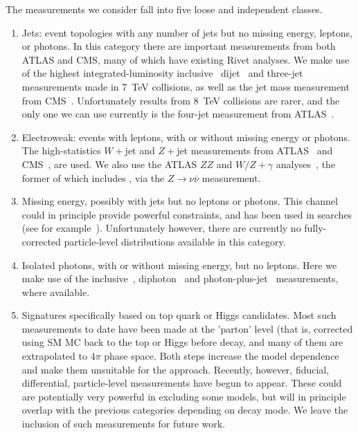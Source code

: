 \documentclass[floatfix]{article}
\begin{document}
The measurements we consider fall into five loose and independent classes.
\begin{enumerate}
\item
Jets: event topologies with any number of jets but no missing energy, leptons, or photons. In this category there
are important measurements from both ATLAS and CMS, many of which have existing Rivet analyses. We make use of 
the highest integrated-luminosity inclusive~\cite{Aad:2014vwa,Chatrchyan:2014gia} dijet~\cite{Aad:2013tea,Aad:2014pua} 
and three-jet~\cite{Aad:2014rma} %
measurements made in 7~TeV collisions, as well as the jet mass 
measurement from CMS~\cite{Chatrchyan:2013vbb}.
Unfortunately results from 8~TeV collisions are rarer, and the only one we can use currently is the four-jet 
measurement from ATLAS~\cite{Aad:2015nda}.
\item
Electroweak: events with leptons, with or without missing energy or photons. The high-statistics $W+$jet and $Z+$jet measurements from ATLAS~\cite{Aad:2014qxa,Aad:2013ysa} 
and CMS~\cite{Khachatryan:2014uva}, are used.
We also use the ATLAS $ZZ$ and $W/Z+\gamma$ analyses~\cite{Aad:2012awa,Aad:2013izg}, the former of which includes \MET, 
via the $Z \rightarrow \nu\bar{\nu}$ measurement.
\item
Missing energy, possibly with jets but no leptons or photons. This channel could in principle provide powerful constraints, and has been used in searches (see for example~\cite{Aad:2012fqa}). Unfortunately however, there are currently no fully-corrected particle-level distributions available in this category. 
\item
Isolated photons, with or without missing energy, but no leptons. Here we make use of the inclusive~\cite{Aad:2013zba}, diphoton~\cite{Aad:2012tba} and 
photon-plus-jet~\cite{ATLAS:2012ar} measurements, where available.
\item
Signatures specifically based on top quark or Higgs candidates. Most such measurements to date have been made at the 'parton' level (that is,
corrected using SM MC back to the top or Higgs before decay, and many of them are extrapolated to $4\pi$ phase space. Both steps increase
the model dependence and make them unsuitable for the \Contur approach. Recently, however, fiducial, differential, particle-level measurements
have begun to appear\cite{Aad:2015hna,Khachatryan:2016gxp}. These could are potentially very powerful in excluding some models, but will in principle overlap with the previous 
categories depending on decay mode. We leave the inclusion of such measurements for future work.
\end{enumerate}
\end{document}
